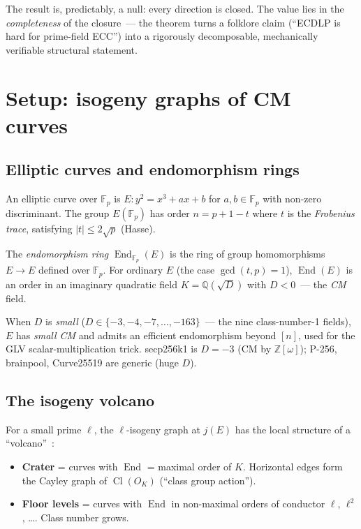 \documentclass[11pt,a4paper]{article}
\theoremstyle{definition}
\newcommand{\FF}{\mathbb{F}}
\newcommand{\ZZ}{\mathbb{Z}}
\newcommand{\QQ}{\mathbb{Q}}
\newcommand{\End}{\operatorname{End}}
\newcommand{\Cl}{\operatorname{Cl}}
\renewcommand{\gcd}{\operatorname{gcd}}
\begin{document}
The result is, predictably, a null: every direction is closed.
The value lies in the \emph{completeness} of the closure~--- the
theorem turns a folklore claim (``ECDLP is hard for prime-field
ECC'') into a rigorously decomposable, mechanically verifiable
structural statement.

\section{Setup: isogeny graphs of CM curves}

\subsection{Elliptic curves and endomorphism rings}

An elliptic curve over $\FF_p$ is $E\colon y^2 = x^3 + ax + b$ for
$a, b \in \FF_p$ with non-zero discriminant. The group $E(\FF_p)$
has order $n = p + 1 - t$ where $t$ is the \emph{Frobenius trace},
satisfying $|t| \leq 2\sqrt{p}$ (Hasse).

The \emph{endomorphism ring} $\End_{\FF_p}(E)$ is the ring of
group homomorphisms $E \to E$ defined over $\FF_p$. For ordinary
$E$ (the case $\gcd(t, p) = 1$), $\End(E)$ is an order in an
imaginary quadratic field $K = \QQ(\sqrt{D})$ with $D < 0$~---
the \emph{CM} field.

When $D$ is \emph{small} ($D \in \{-3, -4, -7, \ldots, -163\}$~---
the nine class-number-1 fields), $E$ has \emph{small CM} and
admits an efficient endomorphism beyond $[n]$, used for the GLV
scalar-multiplication trick. secp256k1 is $D = -3$ (CM by
$\ZZ[\omega]$); P-256, brainpool, Curve25519 are generic (huge $D$).

\subsection{The isogeny volcano}

For a small prime $\ell$, the $\ell$-isogeny graph at $j(E)$ has
the local structure of a ``volcano''~\cite{kohel1996,fouquetmorain2002}:

\begin{itemize}
\item \textbf{Crater} = curves with $\End$ = maximal order of $K$.
      Horizontal edges form the Cayley graph of $\Cl(O_K)$ (``class
      group action'').
\item \textbf{Floor levels} = curves with $\End$ in non-maximal
      orders of conductor $\ell$, $\ell^2$, \ldots. Class number
      grows.
\end{itemize}
\end{document}
